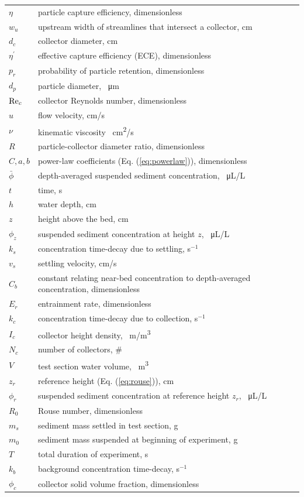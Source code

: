 \documentclass[geosciences,article,submit,moreauthors,pdftex]{Definitions/mdpi}
\begin{document}
{ \noindent \begin{tabular}{@{}ll}
 $\eta$ & particle capture efficiency, dimensionless\\
 $w_u$ & upstream width of streamlines that intersect a collector, cm\\
 $d_c$ & collector diameter, cm\\
 $\eta^\prime$ & effective capture efficiency (ECE), dimensionless\\
 $p_r$ & probability of particle retention, dimensionless \\
 $d_p$ & particle diameter, \SI{}{\micro\metre} \\
 $\mathrm{Re}_c$ & collector Reynolds number, dimensionless \\
 $u$ & flow velocity, cm/s \\
 $\nu$ & kinematic viscosity \SI{}{\centi\metre\squared/\second} \\
 $R$ & particle-collector diameter ratio, dimensionless \\
 $C,a,b$ & power-law coefficients (Eq. (\ref{eq:powerlaw})), dimensionless \\
 $\bar{\phi}$ & depth-averaged suspended sediment concentration, \SI{}{\micro\liter/\liter} \\
 $t$ & time, s \\
 $h$ & water depth, cm \\
 $z$ & height above the bed, cm \\
 $\phi_z$ & suspended sediment concentration at height $z$, \SI{}{\micro\liter/\liter} \\
 $k_s$ & concentration time-decay due to settling, s$^{-1}$ \\
 $v_s$ & settling velocity, cm/s \\
 $C_b$ & constant relating near-bed concentration to depth-averaged concentration, dimensionless \\
 $E_r$ & entrainment rate, dimensionless \\
 $k_c$ & concentration time-decay due to collection, s$^{-1}$ \\
 $I_c$ & collector height density, \SI{}{\metre/\metre\cubed} \\
 $N_c$ & number of collectors, \# \\
 $V$ & test section water volume, \SI{}{\metre\cubed} \\
 $z_r$ & reference height (Eq. (\ref{eq:rouse})), cm \\
 $\phi_r$ & suspended sediment concentration at reference height $z_r$, \SI{}{\micro\liter/\liter} \\
 $R_0$ & Rouse number, dimensionless \\
 $m_s$ & sediment mass settled in test section, g \\
 $m_0$ & sediment mass suspended at beginning of experiment, g \\
 $T$ & total duration of experiment, s \\
 $k_b$ & background concentration time-decay, s$^{-1}$ \\
 $\phi_c$ & collector solid volume fraction, dimensionless
 \end{tabular}}
\end{document}
